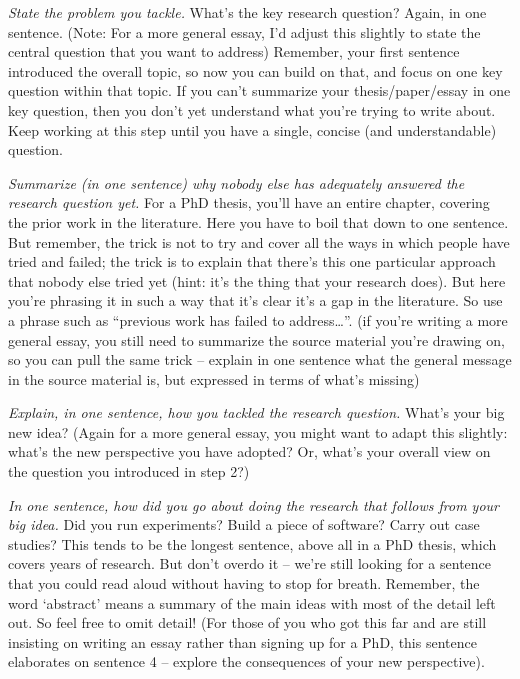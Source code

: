 \emph{State the problem you tackle.}
What’s the key research question?
Again, in one sentence.
(Note: For a more general essay, I’d adjust this slightly to state the central question that you want to address)
Remember, your first sentence introduced the overall topic, so now you can build on that, and focus on one key question within that topic.
If you can’t summarize your thesis/paper/essay in one key question, then you don’t yet understand what you’re trying to write about.
Keep working at this step until you have a single, concise (and understandable) question.

\emph{Summarize (in one sentence) why nobody else has adequately answered the research question yet.}
For a PhD thesis, you’ll have an entire chapter, covering the prior work in the literature.
Here you have to boil that down to one sentence.
But remember, the trick is not to try and cover all the ways in which people have tried and failed; the trick is to explain that there’s this one particular approach that nobody else tried yet (hint: it’s the thing that your research does).
But here you’re phrasing it in such a way that it’s clear it’s a gap in the literature.
So use a phrase such as “previous work has failed to address…”.
(if you’re writing a more general essay, you still need to summarize the source material you’re drawing on, so you can pull the same trick – explain in one sentence what the general message in the source material is, but expressed in terms of what’s missing)

\emph{Explain, in one sentence, how you tackled the research question.}
What’s your big new idea?
(Again for a more general essay, you might want to adapt this slightly: what’s the new perspective you have adopted?
Or, what’s your overall view on the question you introduced in step 2?)

\emph{In one sentence, how did you go about doing the research that follows from your big idea.}
Did you run experiments?
Build a piece of software?
Carry out case studies?
This tends to be the longest sentence, above all in a PhD thesis, which covers years of research.
But don’t overdo it – we’re still looking for a sentence that you could read aloud without having to stop for breath.
Remember, the word ‘abstract’ means a summary of the main ideas with most of the detail left out.
So feel free to omit detail!
(For those of you who got this far and are still insisting on writing an essay rather than signing up for a PhD, this sentence elaborates on sentence 4 – explore the consequences of your new perspective).

